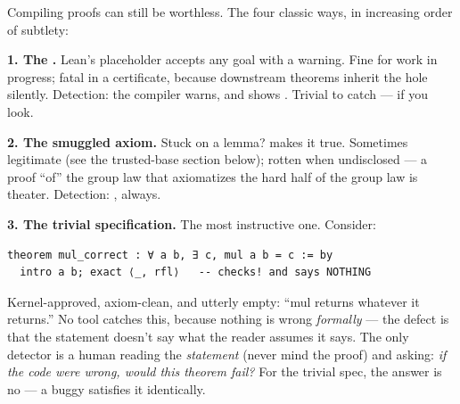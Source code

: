 Compiling proofs can still be worthless. The four classic ways, in
increasing order of subtlety:

\textbf{1. The .} Lean's placeholder accepts any goal with a
warning. Fine for work in progress; fatal in a certificate, because
downstream theorems inherit the hole silently. Detection: the compiler
warns, and  shows . Trivial to catch ---
if you look.

\textbf{2. The smuggled axiom.} Stuck on a lemma?  makes it
true. Sometimes legitimate (see the trusted-base section below); rotten when
undisclosed --- a proof ``of'' the group law that axiomatizes the hard
half of the group law is theater. Detection: , always.

\textbf{3. The trivial specification.} The most instructive one. Consider:

\begin{lstlisting}[language=Lean]
theorem mul_correct : ∀ a b, ∃ c, mul a b = c := by
  intro a b; exact ⟨_, rfl⟩   -- checks! and says NOTHING
\end{lstlisting}

Kernel-approved, axiom-clean, and utterly empty: ``mul returns whatever it
returns.'' No tool catches this, because nothing is wrong \emph{formally}
--- the defect is that the statement doesn't say what the reader assumes it
says. The only detector is a human reading the \emph{statement} (never mind
the proof) and asking: \emph{if the code were wrong, would this theorem
fail?} For the trivial spec, the answer is no --- a buggy 
satisfies it identically.

